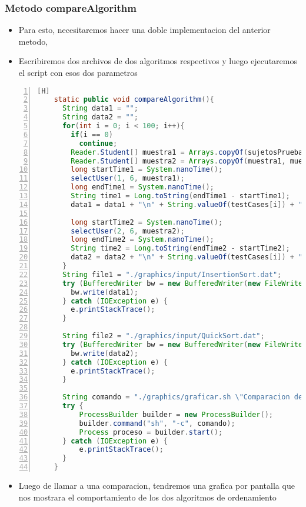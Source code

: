 \subsubsection{Metodo compareAlgorithm}
\begin{itemize}
  \item Para esto, necesitaremos hacer una doble implementacion del anterior metodo,
  \item Escribiremos dos archivos de dos algoritmos respectivos y luego ejecutaremos el script con esos dos parametros

\end{itemize}
\begin{lstlisting}[language=java, caption={Testear algoritmo}, numbers=left, firstnumber=1][H]
    static public void compareAlgorithm(){
      String data1 = "";
      String data2 = "";
      for(int i = 0; i < 100; i++){
        if(i == 0)
          continue;
        Reader.Student[] muestra1 = Arrays.copyOf(sujetosPrueba, testCases[i]);
        Reader.Student[] muestra2 = Arrays.copyOf(muestra1, muestra1.length);
        long startTime1 = System.nanoTime();
        selectUser(1, 6, muestra1);
        long endTime1 = System.nanoTime();
        String time1 = Long.toString(endTime1 - startTime1);
        data1 = data1 + "\n" + String.valueOf(testCases[i]) + "\t" + time1;

        long startTime2 = System.nanoTime();
        selectUser(2, 6, muestra2);
        long endTime2 = System.nanoTime();
        String time2 = Long.toString(endTime2 - startTime2);
        data2 = data2 + "\n" + String.valueOf(testCases[i]) + "\t" + time2;
      }
      String file1 = "./graphics/input/InsertionSort.dat";
      try (BufferedWriter bw = new BufferedWriter(new FileWriter(file1))) {
        bw.write(data1);
      } catch (IOException e) {
        e.printStackTrace();
      }

      String file2 = "./graphics/input/QuickSort.dat";
      try (BufferedWriter bw = new BufferedWriter(new FileWriter(file2))) {
        bw.write(data2);
      } catch (IOException e) {
        e.printStackTrace();
      }

      String comando = "./graphics/graficar.sh \"Comparacion de algoritmos\" " + file1 + " " + file2;
      try {
          ProcessBuilder builder = new ProcessBuilder();
          builder.command("sh", "-c", comando);
          Process proceso = builder.start();
      } catch (IOException e) {
          e.printStackTrace();
      }
    }

\end{lstlisting}
\begin{itemize}
  \item Luego de llamar a una comparacion, tendremos una grafica por pantalla que nos mostrara el comportamiento de los dos algoritmos de ordenamiento
\end{itemize}
